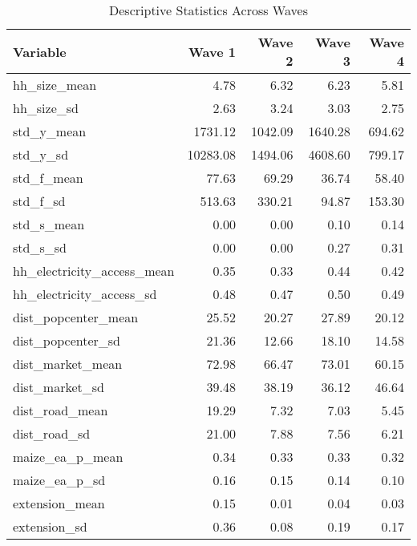 \begin{table}[ht]
\centering
\caption{Descriptive Statistics Across Waves} 
\begin{tabular}{lrrrr}
  \hline
Variable & Wave 1 & Wave 2 & Wave 3 & Wave 4 \\ 
  \hline
hh_size_mean & 4.78 & 6.32 & 6.23 & 5.81 \\ 
  hh_size_sd & 2.63 & 3.24 & 3.03 & 2.75 \\ 
  std_y_mean & 1731.12 & 1042.09 & 1640.28 & 694.62 \\ 
  std_y_sd & 10283.08 & 1494.06 & 4608.60 & 799.17 \\ 
  std_f_mean & 77.63 & 69.29 & 36.74 & 58.40 \\ 
  std_f_sd & 513.63 & 330.21 & 94.87 & 153.30 \\ 
  std_s_mean & 0.00 & 0.00 & 0.10 & 0.14 \\ 
  std_s_sd & 0.00 & 0.00 & 0.27 & 0.31 \\ 
  hh_electricity_access_mean & 0.35 & 0.33 & 0.44 & 0.42 \\ 
  hh_electricity_access_sd & 0.48 & 0.47 & 0.50 & 0.49 \\ 
  dist_popcenter_mean & 25.52 & 20.27 & 27.89 & 20.12 \\ 
  dist_popcenter_sd & 21.36 & 12.66 & 18.10 & 14.58 \\ 
  dist_market_mean & 72.98 & 66.47 & 73.01 & 60.15 \\ 
  dist_market_sd & 39.48 & 38.19 & 36.12 & 46.64 \\ 
  dist_road_mean & 19.29 & 7.32 & 7.03 & 5.45 \\ 
  dist_road_sd & 21.00 & 7.88 & 7.56 & 6.21 \\ 
  maize_ea_p_mean & 0.34 & 0.33 & 0.33 & 0.32 \\ 
  maize_ea_p_sd & 0.16 & 0.15 & 0.14 & 0.10 \\ 
  extension_mean & 0.15 & 0.01 & 0.04 & 0.03 \\ 
  extension_sd & 0.36 & 0.08 & 0.19 & 0.17 \\ 
   \hline
\end{tabular}
\end{table}
